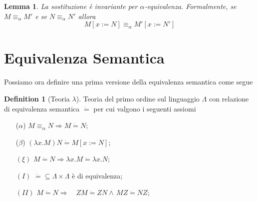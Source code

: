 \documentclass[a4paper,11pt]{article}
\newtheorem{lemma}{Lemma}
\theoremstyle{definition}
\newtheorem{defn}{Definition}
\begin{document}
\begin{lemma}
  La sostituzione è invariante per $\alpha$-equivalenza. Formalmente, se
  $M\equiv_\alpha M'$ e se $N\equiv_\alpha N'$ allora
  \[
    M[x:= N] \equiv_\alpha M'[x:=N']
  \]
\end{lemma}

\section{Equivalenza Semantica}
Possiamo ora definire una prima versione della equivalenza semantica come segue
\begin{defn}[Teoria $\lambda$]
  Teoria del primo ordine sul linguaggio $\Lambda$ con relazione di equivalenza semantica 
  $\dot =$ per cui valgono i seguenti assiomi
  \begin{itemize}
    \item[($\alpha$)] $M\equiv_\alpha N \Rightarrow M \dot = N$;
    \item[($\beta$)] $(\lambda x.M)N \dot = M[x:=N]$;
    \item[$(\xi)$] $M\dot = N \Rightarrow \lambda x.M \dot = \lambda x.N$;
    \item[$(I)$] $\dot = \subseteq \Lambda\times\Lambda$ è di equivalenza;
    \item[$(II)$] $M\dot = N \Rightarrow \quad ZM\dot =ZN \wedge\, MZ\dot
      =NZ$;
  \end{itemize}
\end{defn}
\end{document}
